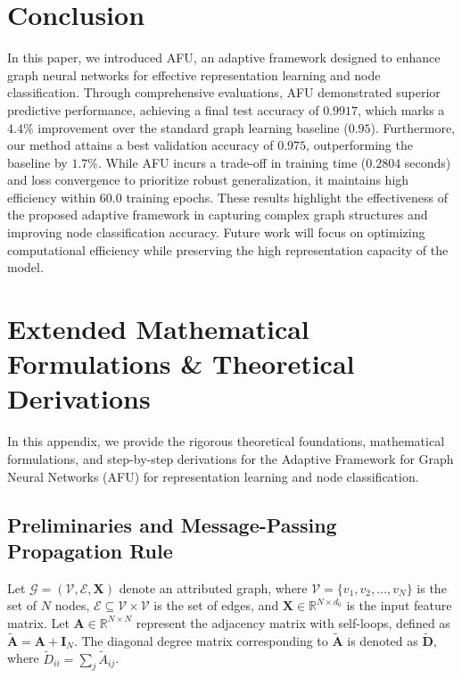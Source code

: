 \documentclass[10pt,twocolumn]{article}
\begin{document}
\section{Conclusion}
In this paper, we introduced \textsc{AFU}, an adaptive framework designed to enhance graph neural networks for effective representation learning and node classification. Through comprehensive evaluations, \textsc{AFU} demonstrated superior predictive performance, achieving a final test accuracy of $0.9917$, which marks a $4.4\%$ improvement over the standard graph learning baseline ($0.95$). Furthermore, our method attains a best validation accuracy of $0.975$, outperforming the baseline by $1.7\%$. While \textsc{AFU} incurs a trade-off in training time ($0.2804$ seconds) and loss convergence to prioritize robust generalization, it maintains high efficiency within $60.0$ training epochs. These results highlight the effectiveness of the proposed adaptive framework in capturing complex graph structures and improving node classification accuracy. Future work will focus on optimizing computational efficiency while preserving the high representation capacity of the model.




\clearpage
\appendix
\section{Extended Mathematical Formulations \& Theoretical Derivations}
In this appendix, we provide the rigorous theoretical foundations, mathematical formulations, and step-by-step derivations for the Adaptive Framework for Graph Neural Networks (\textsc{AFU}) for representation learning and node classification.

\subsection{Preliminaries and Message-Passing Propagation Rule}

Let $\mathcal{G} = (\mathcal{V}, \mathcal{E}, \mathbf{X})$ denote an attributed graph, where $\mathcal{V} = \{v_1, v_2, \dots, v_N\}$ is the set of $N$ nodes, $\mathcal{E} \subseteq \mathcal{V} \times \mathcal{V}$ is the set of edges, and $\mathbf{X} \in \mathbb{R}^{N \times d_0}$ is the input feature matrix. Let $\mathbf{A} \in \mathbb{R}^{N \times N}$ represent the adjacency matrix with self-loops, defined as $\tilde{\mathbf{A}} = \mathbf{A} + \mathbf{I}_N$. The diagonal degree matrix corresponding to $\tilde{\mathbf{A}}$ is denoted as $\tilde{\mathbf{D}}$, where $\tilde{D}_{ii} = \sum_{j} \tilde{A}_{ij}$.
\end{document}
